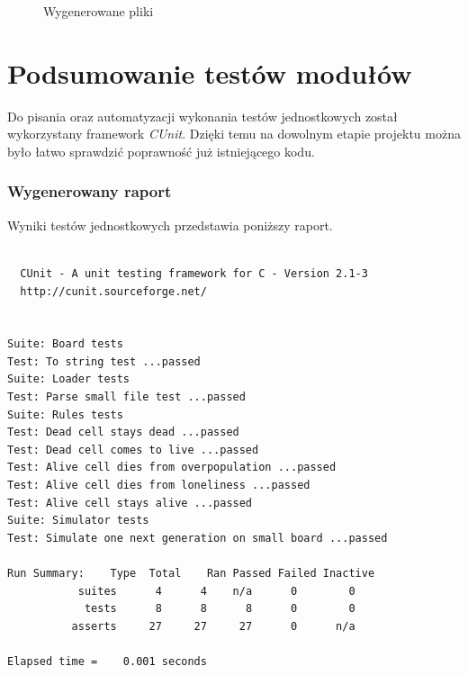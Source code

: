\documentclass{mwart}
\begin{document}
\begin{figure}[H]
  \hspace{0.7cm}
  
  \caption{Wygenerowane pliki}
  \label{fig:GliderExample}
\end{figure}

\section{Podsumowanie testów modułów}
Do pisania oraz automatyzacji wykonania testów jednostkowych został wykorzystany framework \textit{CUnit}. Dzięki temu na dowolnym etapie projektu można było łatwo sprawdzić poprawność już istniejącego kodu.

\subsubsection{Wygenerowany raport}
Wyniki testów jednostkowych przedstawia poniższy raport.

\begin{verbatim}

  CUnit - A unit testing framework for C - Version 2.1-3
  http://cunit.sourceforge.net/


Suite: Board tests
Test: To string test ...passed
Suite: Loader tests
Test: Parse small file test ...passed
Suite: Rules tests
Test: Dead cell stays dead ...passed
Test: Dead cell comes to live ...passed
Test: Alive cell dies from overpopulation ...passed
Test: Alive cell dies from loneliness ...passed
Test: Alive cell stays alive ...passed
Suite: Simulator tests
Test: Simulate one next generation on small board ...passed

Run Summary:    Type  Total    Ran Passed Failed Inactive
           suites      4      4    n/a      0        0
            tests      8      8      8      0        0
          asserts     27     27     27      0      n/a

Elapsed time =    0.001 seconds
\end{verbatim}
\end{document}
